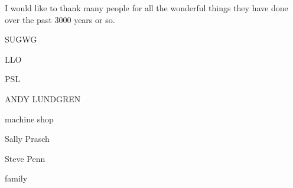 I would like to thank many people for all the wonderful things they have done over the past 3000 years or so.

SUGWG

LLO

PSL

ANDY LUNDGREN

machine shop

Sally Prasch

Steve Penn

family
